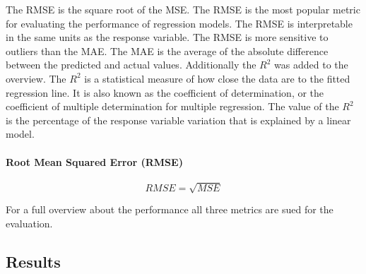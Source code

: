 The RMSE is the square root of the MSE. The RMSE is the most popular metric for evaluating the
performance of regression models. The RMSE is interpretable in the same units as the response
variable. The RMSE is more sensitive to outliers than the MAE.
The MAE is the average of the absolute difference between the predicted and actual values.
Additionally the $R^2$ was added to the overview. The $R^2$ is a statistical measure of how close
the data are to the fitted regression line. It is also known as the coefficient of determination,
or the coefficient of multiple determination for multiple regression. The value of the $R^2$ is
the percentage of the response variable variation that is explained by a linear model.

\paragraph*{Root Mean Squared Error (RMSE)}

\begin{equation}
    \label{eq:rmse}
    RMSE = \sqrt{MSE}
\end{equation}

For a full overview about the performance all three metrics are sued for the evaluation.




\subsection{Results}


